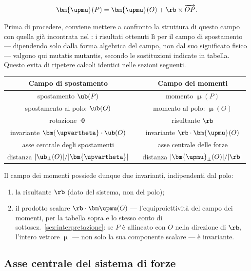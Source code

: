 \begin{equation}\label{eq:variazione_momento}
\bm{\upmu}(P)
		= \bm{\upmu}(O) + \rb \times \overrightarrow{OP}.
\end{equation}


Prima di procedere, conviene mettere a confronto la struttura di questo
campo con quella già incontrata nel :
i risultati ottenuti lì per il campo di spostamento --- dipendendo solo
dalla forma algebrica del campo, non dal suo significato fisico ---
valgono qui mutatis mutantis, secondo le sostituzioni indicate in tabella.
Questo evita di ripetere calcoli identici nelle sezioni seguenti.

\begin{center}
	\renewcommand{\arraystretch}{1.4}
	\begin{tabular}{ccc}
		\toprule
		\textbf{Campo di spostamento} & & \textbf{Campo dei momenti} \\
		\midrule
		spostamento $\ub(P)$ & & momento $\bm{\upmu}(P)$ \\
		spostamento al polo: $\ub(O)$ & & momento al polo: $\bm{\upmu}(O)$ \\
		rotazione $\bm{\upvartheta}$ & & risultante $\rb$ \\
		invariante $\bm{\upvartheta}\cdot\ub(O)$ & & invariante $\rb\cdot\bm{\upmu}(O)$ \\
		asse centrale degli spostamenti & & asse centrale delle forze \\
		distanza $|\ub_\perp(O)|/|\bm{\upvartheta}|$ & & distanza $|\bm{\upmu}_\perp(O)|/|\rb|$ \\
		\bottomrule
	\end{tabular}
\end{center}

Il campo dei momenti possiede dunque due invarianti, indipendenti dal
polo:
\begin{enumerate}[label=(\roman*)]
	\item la risultante $\rb$ (dato del sistema, non del polo);
	\item il prodotto scalare $\rb\cdot\bm\upmu(O)$ --- l'equiproiettività
	del campo dei momenti, per la tabella sopra e lo stesso conto di
	sottosez.~\ref{sez:interpretazione}: se $P$ è allineato con $O$ nella
	direzione di $\rb$, l'intero vettore $\bm\upmu$ --- non solo la sua
	componente scalare --- è invariante.
\end{enumerate}


\subsection{Asse centrale del sistema di forze}

